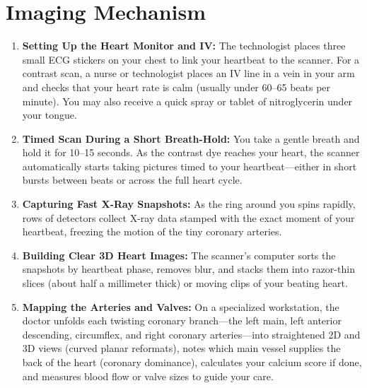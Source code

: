 \section{Imaging Mechanism}
\begin{enumerate}
    \item \textbf{Setting Up the Heart Monitor and IV:} The technologist places three small ECG stickers on your chest to link your heartbeat to the scanner. For a contrast scan, a nurse or technologist places an IV line in a vein in your arm and checks that your heart rate is calm (usually under 60--65 beats per minute). You may also receive a quick spray or tablet of nitroglycerin under your tongue.
    \item \textbf{Timed Scan During a Short Breath-Hold:} You take a gentle breath and hold it for 10--15 seconds. As the contrast dye reaches your heart, the scanner automatically starts taking pictures timed to your heartbeat---either in short bursts between beats or across the full heart cycle.
    \item \textbf{Capturing Fast X-Ray Snapshots:} As the ring around you spins rapidly, rows of detectors collect X-ray data stamped with the exact moment of your heartbeat, freezing the motion of the tiny coronary arteries.
    \item \textbf{Building Clear 3D Heart Images:} The scanner's computer sorts the snapshots by heartbeat phase, removes blur, and stacks them into razor-thin slices (about half a millimeter thick) or moving clips of your beating heart.
    \item \textbf{Mapping the Arteries and Valves:} On a specialized workstation, the doctor unfolds each twisting coronary branch---the left main, left anterior descending, circumflex, and right coronary arteries---into straightened 2D and 3D views (curved planar reformats), notes which main vessel supplies the back of the heart (coronary dominance), calculates your calcium score if done, and measures blood flow or valve sizes to guide your care.
\end{enumerate}

